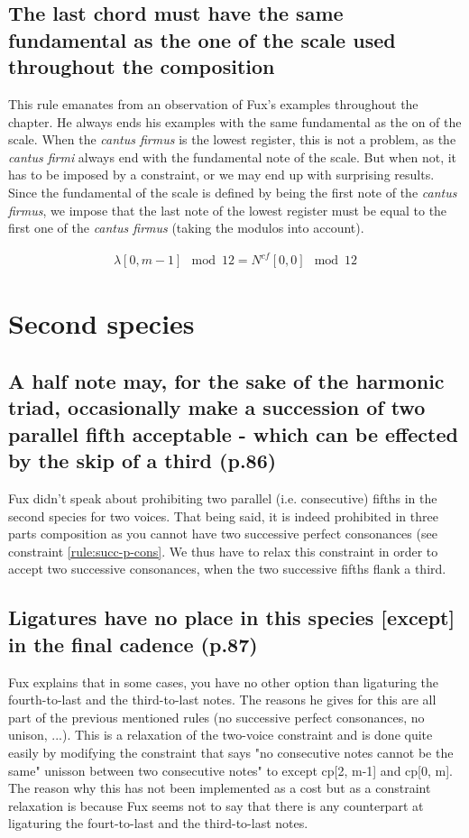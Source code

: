 \subsection{\reddot The last chord must have the same fundamental as the one of the scale used throughout the composition}
This rule emanates from an observation of Fux's examples throughout the chapter. He always ends his examples with the same fundamental as the on of the scale.
When the \textit{cantus firmus} is the lowest register, this is not a problem, as the \textit{cantus firmi} always end with the fundamental note of the scale. But when not, it has to be imposed by a constraint, or we may end up with surprising results. Since the fundamental of the scale is defined by being the first note of the \textit{cantus firmus}, we impose that the last note of the lowest register must be equal to the first one of the \textit{cantus firmus} (taking the modulos into account).


\begin{equation} \begin{aligned}
\lambda[0, m-1] \mod 12 = N^{cf}[0, 0] \mod 12
\end{aligned} \end{equation}



\section{Second species}
\subsection{A half note may, for the sake of the harmonic triad, occasionally make a succession of two parallel fifth acceptable - which can be effected by the skip of a third (p.86)}
Fux didn't speak about prohibiting two parallel (i.e. consecutive) fifths in the second species for two voices. That being said, it is indeed prohibited in three parts composition as you cannot have two successive perfect consonances (see constraint \ref{rule:succ-p-cons}. We thus have to relax this constraint in order to accept two successive consonances, when the two successive fifths flank a third.


\subsection{Ligatures have no place in this species [except] in the final cadence (p.87)}
Fux explains that in some cases, you have no other option than ligaturing the fourth-to-last and the third-to-last notes. The reasons he gives for this are all part of the previous mentioned rules (no successive perfect consonances, no unison, ...).
This is a relaxation of the two-voice constraint and is done quite easily by modifying the constraint that says "no consecutive notes cannot be the same" unisson between two consecutive notes" to except cp[2, m-1] and cp[0, m]. The reason why this has not been implemented as a cost but as a constraint relaxation is because Fux seems not to say that there is any counterpart at ligaturing the fourt-to-last and the third-to-last notes.

